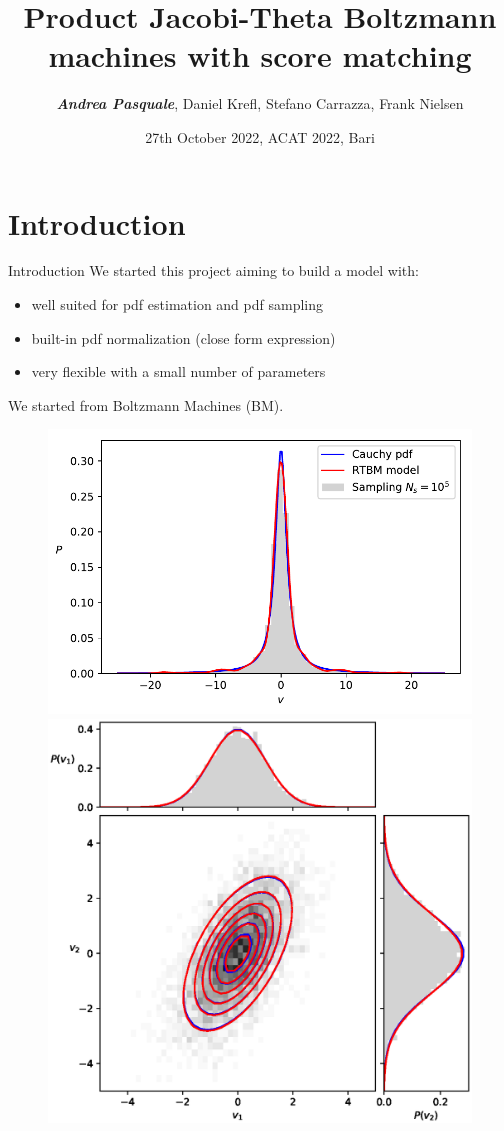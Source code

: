 \documentclass[10pt]{beamer}
\title{Product Jacobi-Theta Boltzmann machines with score matching}
\author{\textit{\textbf{Andrea Pasquale}}, Daniel Krefl, Stefano Carrazza, Frank Nielsen}
\date{27th October 2022, ACAT 2022, Bari}
\begin{document}
\maketitle

\section{Introduction}

\begin{frame}{Introduction}
    We started this project aiming to build a model with:
    \begin{itemize}
        \item well suited for pdf estimation and pdf sampling 
        \item built-in pdf normalization (close form expression)
        \item very flexible with a small number of parameters
    \end{itemize}
    We started from Boltzmann Machines (BM).
    \begin{figure}
        \begin{center}
            \includegraphics[scale=0.5]{figures/cauchy.pdf}
            \includegraphics[scale=0.4]{figures/Gaussian2d.eps}

\end{center}
\end{figure}
\end{frame}
\end{document}
